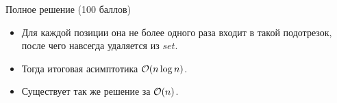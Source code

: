 \begin{frame}{Полное решение (100 баллов)}
  \begin{itemize}
  \item Для каждой позиции она не более одного раза входит в такой подотрезок, после чего навсегда удаляется из $set$.
  \item Тогда итоговая асимптотика $\mathcal{O}(n \log n)$.
  \item Существует так же решение за $\mathcal{O}(n)$.
  \end{itemize}
\end{frame}
